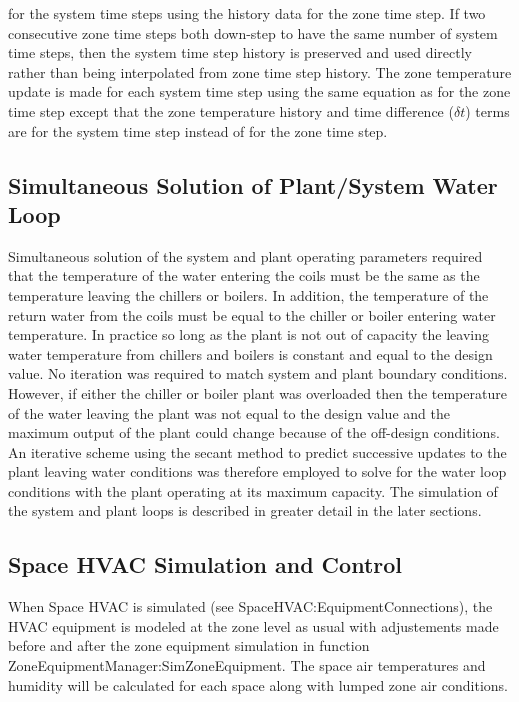 for the system time steps using the history data for the zone time step. If two consecutive zone time steps both down-step to have the same number of system time steps, then the system time step history is preserved and used directly rather than being interpolated from zone time step history. The zone temperature update is made for each system time step using the same equation as for the zone time step except that the zone temperature history and time difference (\(\delta t\)) terms are for the system time step instead of for the zone time step.

\subsection{Simultaneous Solution of Plant/System Water Loop}\label{simultaneous-solution-of-plantsystem-water-loop}

Simultaneous solution of the system and plant operating parameters required that the temperature of the water entering the coils must be the same as the temperature leaving the chillers or boilers. In addition, the temperature of the return water from the coils must be equal to the chiller or boiler entering water temperature. In practice so long as the plant is not out of capacity the leaving water temperature from chillers and boilers is constant and equal to the design value. No iteration was required to match system and plant boundary conditions. However, if either the chiller or boiler plant was overloaded then the temperature of the water leaving the plant was not equal to the design value and the maximum output of the plant could change because of the off-design conditions. An iterative scheme using the secant method to predict successive updates to the plant leaving water conditions was therefore employed to solve for the water loop conditions with the plant operating at its maximum capacity. The simulation of the system and plant loops is described in greater detail in the later sections.

\subsection{Space HVAC Simulation and Control}\label{space-hvac-simulation-and-control}
When Space HVAC is simulated (see SpaceHVAC:EquipmentConnections), the HVAC equipment is modeled at the zone level as usual with adjustements made before and after the zone equipment simulation in function ZoneEquipmentManager:SimZoneEquipment. The space air temperatures and humidity will be calculated for each space along with lumped zone air conditions.

